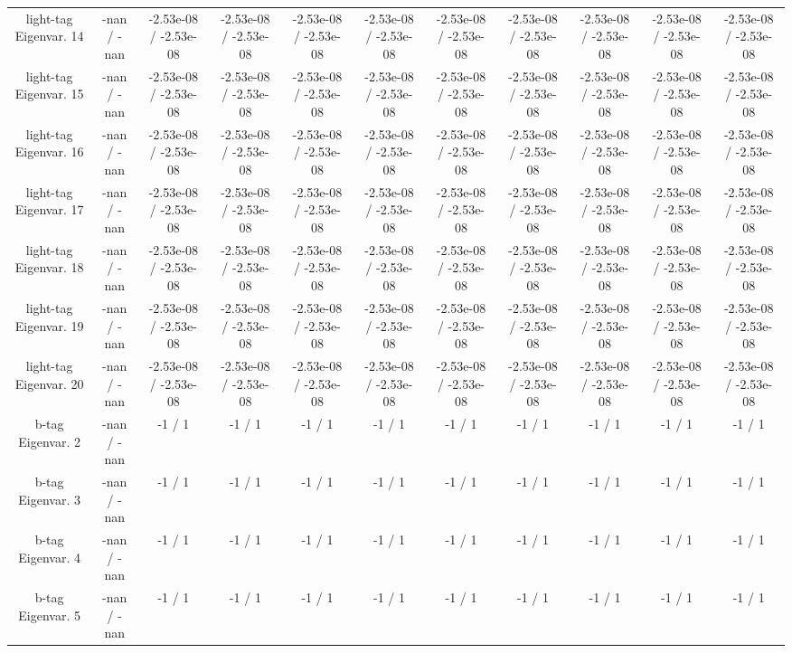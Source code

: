 \begin{table}[htbp]
\begin{center}
\begin{tabular}{|c|c|c|c|c|c|c|c|c|c|c|}
  light-tag Eigenvar. 14 & -nan / -nan & -2.53e-08 / -2.53e-08 & -2.53e-08 / -2.53e-08 & -2.53e-08 / -2.53e-08 & -2.53e-08 / -2.53e-08 & -2.53e-08 / -2.53e-08 & -2.53e-08 / -2.53e-08 & -2.53e-08 / -2.53e-08 & -2.53e-08 / -2.53e-08 & -2.53e-08 / -2.53e-08 \\ 
  light-tag Eigenvar. 15 & -nan / -nan & -2.53e-08 / -2.53e-08 & -2.53e-08 / -2.53e-08 & -2.53e-08 / -2.53e-08 & -2.53e-08 / -2.53e-08 & -2.53e-08 / -2.53e-08 & -2.53e-08 / -2.53e-08 & -2.53e-08 / -2.53e-08 & -2.53e-08 / -2.53e-08 & -2.53e-08 / -2.53e-08 \\ 
  light-tag Eigenvar. 16 & -nan / -nan & -2.53e-08 / -2.53e-08 & -2.53e-08 / -2.53e-08 & -2.53e-08 / -2.53e-08 & -2.53e-08 / -2.53e-08 & -2.53e-08 / -2.53e-08 & -2.53e-08 / -2.53e-08 & -2.53e-08 / -2.53e-08 & -2.53e-08 / -2.53e-08 & -2.53e-08 / -2.53e-08 \\ 
  light-tag Eigenvar. 17 & -nan / -nan & -2.53e-08 / -2.53e-08 & -2.53e-08 / -2.53e-08 & -2.53e-08 / -2.53e-08 & -2.53e-08 / -2.53e-08 & -2.53e-08 / -2.53e-08 & -2.53e-08 / -2.53e-08 & -2.53e-08 / -2.53e-08 & -2.53e-08 / -2.53e-08 & -2.53e-08 / -2.53e-08 \\ 
  light-tag Eigenvar. 18 & -nan / -nan & -2.53e-08 / -2.53e-08 & -2.53e-08 / -2.53e-08 & -2.53e-08 / -2.53e-08 & -2.53e-08 / -2.53e-08 & -2.53e-08 / -2.53e-08 & -2.53e-08 / -2.53e-08 & -2.53e-08 / -2.53e-08 & -2.53e-08 / -2.53e-08 & -2.53e-08 / -2.53e-08 \\ 
  light-tag Eigenvar. 19 & -nan / -nan & -2.53e-08 / -2.53e-08 & -2.53e-08 / -2.53e-08 & -2.53e-08 / -2.53e-08 & -2.53e-08 / -2.53e-08 & -2.53e-08 / -2.53e-08 & -2.53e-08 / -2.53e-08 & -2.53e-08 / -2.53e-08 & -2.53e-08 / -2.53e-08 & -2.53e-08 / -2.53e-08 \\ 
  light-tag Eigenvar. 20 & -nan / -nan & -2.53e-08 / -2.53e-08 & -2.53e-08 / -2.53e-08 & -2.53e-08 / -2.53e-08 & -2.53e-08 / -2.53e-08 & -2.53e-08 / -2.53e-08 & -2.53e-08 / -2.53e-08 & -2.53e-08 / -2.53e-08 & -2.53e-08 / -2.53e-08 & -2.53e-08 / -2.53e-08 \\ 
  b-tag Eigenvar. 2 & -nan / -nan & -1 / 1 & -1 / 1 & -1 / 1 & -1 / 1 & -1 / 1 & -1 / 1 & -1 / 1 & -1 / 1 & -1 / 1 \\ 
  b-tag Eigenvar. 3 & -nan / -nan & -1 / 1 & -1 / 1 & -1 / 1 & -1 / 1 & -1 / 1 & -1 / 1 & -1 / 1 & -1 / 1 & -1 / 1 \\ 
  b-tag Eigenvar. 4 & -nan / -nan & -1 / 1 & -1 / 1 & -1 / 1 & -1 / 1 & -1 / 1 & -1 / 1 & -1 / 1 & -1 / 1 & -1 / 1 \\ 
  b-tag Eigenvar. 5 & -nan / -nan & -1 / 1 & -1 / 1 & -1 / 1 & -1 / 1 & -1 / 1 & -1 / 1 & -1 / 1 & -1 / 1 & -1 / 1 \\ 

\end{tabular}
\end{center}
\end{table}
